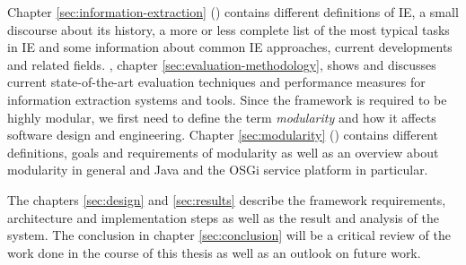 Chapter \ref{sec:information-extraction} () contains different definitions of \gls{IE}, a small discourse about its history, a more or less complete list of the most typical tasks in \gls{IE} and some information about common \gls{IE} approaches, current developments and related fields. , chapter \ref{sec:evaluation-methodology}, shows and discusses current state-of-the-art evaluation techniques and performance measures for information extraction systems and tools. Since the framework is required to be highly modular, we first need to define the term \textit{modularity} and how it affects software design and engineering. Chapter \ref{sec:modularity} () contains different definitions, goals and requirements of modularity as well as an overview about modularity in general and Java and the \gls{OSGi} service platform in particular.

The chapters \ref{sec:design}  and \ref{sec:results}  describe the framework requirements, architecture and implementation steps as well as the result and analysis of the system. The conclusion in chapter \ref{sec:conclusion} will be a critical review of the work done in the course of this thesis as well as an outlook on future work.